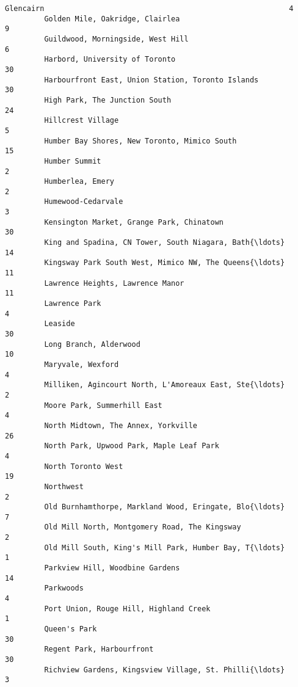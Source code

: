 \documentclass[11pt]{article}
\begin{document}
\begin{Verbatim}[commandchars=\\\{\}]
         Glencairn                                                        4  
         Golden Mile, Oakridge, Clairlea                                  9  
         Guildwood, Morningside, West Hill                                6  
         Harbord, University of Toronto                                  30  
         Harbourfront East, Union Station, Toronto Islands               30  
         High Park, The Junction South                                   24  
         Hillcrest Village                                                5  
         Humber Bay Shores, New Toronto, Mimico South                    15  
         Humber Summit                                                    2  
         Humberlea, Emery                                                 2  
         Humewood-Cedarvale                                               3  
         Kensington Market, Grange Park, Chinatown                       30  
         King and Spadina, CN Tower, South Niagara, Bath{\ldots}              14  
         Kingsway Park South West, Mimico NW, The Queens{\ldots}              11  
         Lawrence Heights, Lawrence Manor                                11  
         Lawrence Park                                                    4  
         Leaside                                                         30  
         Long Branch, Alderwood                                          10  
         Maryvale, Wexford                                                4  
         Milliken, Agincourt North, L'Amoreaux East, Ste{\ldots}               2  
         Moore Park, Summerhill East                                      4  
         North Midtown, The Annex, Yorkville                             26  
         North Park, Upwood Park, Maple Leaf Park                         4  
         North Toronto West                                              19  
         Northwest                                                        2  
         Old Burnhamthorpe, Markland Wood, Eringate, Blo{\ldots}               7  
         Old Mill North, Montgomery Road, The Kingsway                    2  
         Old Mill South, King's Mill Park, Humber Bay, T{\ldots}               1  
         Parkview Hill, Woodbine Gardens                                 14  
         Parkwoods                                                        4  
         Port Union, Rouge Hill, Highland Creek                           1  
         Queen's Park                                                    30  
         Regent Park, Harbourfront                                       30  
         Richview Gardens, Kingsview Village, St. Philli{\ldots}               3  

\end{Verbatim}
\end{document}

